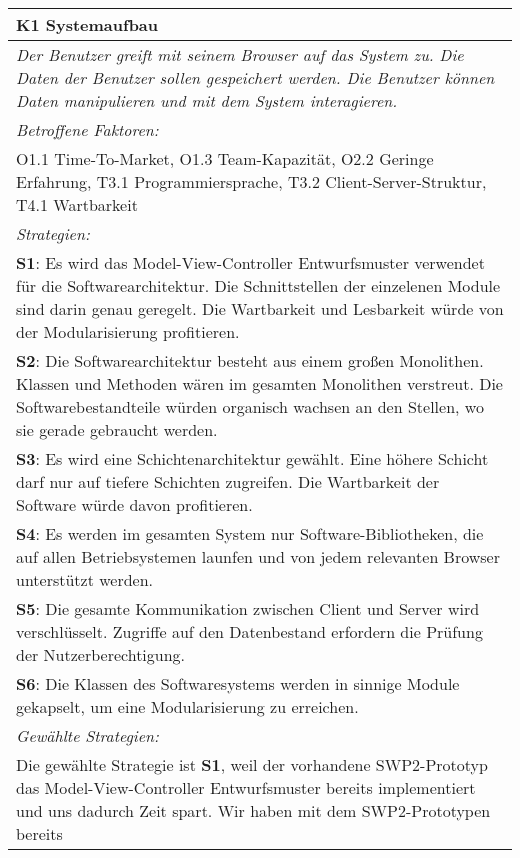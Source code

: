 {%
\begin{center}
\begin{minipage}{\linewidth}
    \centering
\renewcommand{\arraystretch}{1.5}
\begin{tabular}{|>{\centering\arraybackslash}p{15cm}|}
            \hline
            \label{K1}
           \textbf{K1 Systemaufbau}\\ \hline
            \textit{Der Benutzer greift mit seinem Browser auf das System zu. Die Daten der Benutzer sollen gespeichert werden. Die Benutzer können Daten manipulieren und mit dem System interagieren.}\\ \hline
            \textit{Betroffene Faktoren:} \\ 
	O1.1 Time-To-Market, O1.3 Team-Kapazität, O2.2 Geringe Erfahrung, T3.1 Programmiersprache, T3.2 Client-Server-Struktur, T4.1 Wartbarkeit
	\\ \hline
	      \textit{Strategien:}\\ 
\textbf{S1}: Es wird das Model-View-Controller Entwurfsmuster verwendet für die Softwarearchitektur. Die Schnittstellen der einzelenen Module sind darin genau geregelt. Die Wartbarkeit und Lesbarkeit würde von der Modularisierung profitieren.\\
\textbf{S2}: Die Softwarearchitektur besteht aus einem großen Monolithen. Klassen und Methoden wären im gesamten Monolithen verstreut. Die Softwarebestandteile würden organisch wachsen an den Stellen, wo sie gerade gebraucht werden.\\
\textbf{S3}:  Es wird eine Schichtenarchitektur gewählt. Eine höhere Schicht darf nur auf tiefere Schichten zugreifen. Die Wartbarkeit der Software würde davon profitieren.\\
\textbf{S4}: Es werden im gesamten System nur Software-Bibliotheken, die auf allen Betriebsystemen launfen und von jedem relevanten Browser unterstützt werden.\\
\textbf{S5}: Die gesamte Kommunikation zwischen Client und Server wird verschlüsselt. Zugriffe auf den Datenbestand erfordern die Prüfung der Nutzerberechtigung.\\
\textbf{S6}: Die Klassen des Softwaresystems werden in sinnige Module gekapselt, um eine Modularisierung zu erreichen.
\\ \hline
	      \textit{Gewählte Strategien:} \\ 
Die gewählte Strategie ist \textbf{S1}, weil der vorhandene SWP2-Prototyp das Model-View-Controller Entwurfsmuster bereits implementiert und uns dadurch Zeit spart. Wir haben mit dem SWP2-Prototypen bereits 

\end{tabular}
\end{minipage}
\end{center}}
